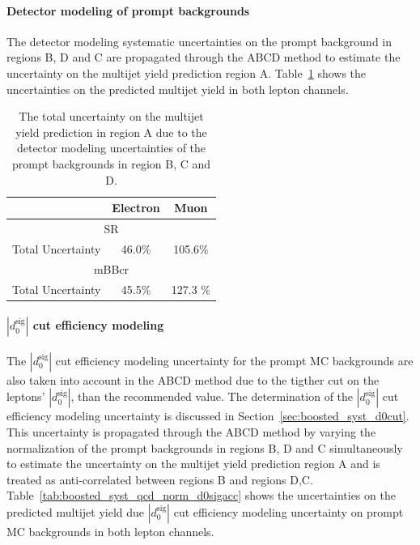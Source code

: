 \paragraph{Detector modeling of prompt backgrounds}
 The detector modeling systematic uncertainties
on the prompt background in regions B, D and C are propagated through the ABCD method to estimate
the uncertainty on the multijet yield prediction region A. Table~\ref{tab:boosted_syst_qcd_norm_detmodel}
shows the uncertainties on the predicted multijet yield in both lepton channels. %
 
\begin{table}[!htbp]
\begin{center}
\begin{tabular}{c|c|c}
& Electron  & Muon  \\  
\hline
\multicolumn{3}{c}{SR} \\
\hline
Total Uncertainty          &  46.0\%  &  105.6\%   \\
\hline
\multicolumn{3}{c}{mBBcr} \\
\hline
Total Uncertainty          &  45.5\%  &  127.3  \%   \\
\hline
\end{tabular}
\end{center}
\caption{The total uncertainty on the multijet yield prediction in region A due to the detector modeling
uncertainties of the prompt backgrounds in region B, C and D.}
\label{tab:boosted_syst_qcd_norm_detmodel}
\end{table}
 
\paragraph{$|d_{0}^{\textrm{sig}}|$ cut efficiency modeling}
The $|d_{0}^{\textrm{sig}}|$ cut efficiency modeling uncertainty for the prompt MC backgrounds
are also taken into account in the ABCD method due to the tigther cut on the leptons' $|d_{0}^{\textrm{sig}}|$,
than the recommended value. The determination of the $|d_{0}^{\textrm{sig}}|$ cut efficiency modeling uncertainty
is discussed in Section~\ref{sec:boosted_syst_d0cut}. This uncertainty is propagated through the ABCD method
by varying the normalization of the prompt backgrounds in regions B, D and C simultaneously to estimate
the uncertainty on the multijet yield prediction region A and is treated as anti-correlated between regions B and regions D,C.
Table~\ref{tab:boosted_syst_qcd_norm_d0sigacc} shows the uncertainties on the predicted multijet yield due
$|d_{0}^{\textrm{sig}}|$ cut efficiency modeling uncertainty on prompt MC backgrounds in both lepton channels.
 

